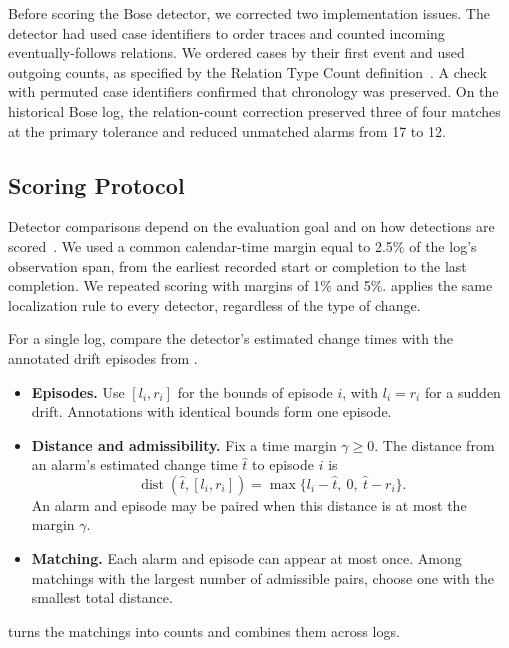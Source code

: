 Before scoring the Bose detector, we corrected two implementation issues. The detector had used case identifiers to order traces and counted incoming eventually-follows relations. We ordered cases by their first event and used outgoing counts, as specified by the Relation Type Count definition~\cite{bose2011handling}. A check with permuted case identifiers confirmed that chronology was preserved. On the historical Bose log, the relation-count correction preserved three of four matches at the primary tolerance and reduced unmatched alarms from 17 to 12.

\subsection{Scoring Protocol}
\label{sec:assessment-scoring}

Detector comparisons depend on the evaluation goal and on how detections are scored~\cite{adams2023experimental}. We used a common calendar-time margin equal to 2.5\% of the log's observation span, from the earliest recorded start or completion to the last completion. We repeated scoring with margins of 1\% and 5\%.  applies the same localization rule to every detector, regardless of the type of change.

\begin{Definition}\label{def:assessment-matching}
For a single log, compare the detector's estimated change times with the annotated drift episodes from .
\begin{itemize}
  \item \textbf{Episodes.} Use $[l_i,r_i]$ for the bounds of episode $i$, with $l_i=r_i$ for a sudden drift. Annotations with identical bounds form one episode.
  \item \textbf{Distance and admissibility.} Fix a time margin $\gamma\geq0$. The distance from an alarm's estimated change time $\hat t$ to episode $i$ is
  \[
     \operatorname{dist}(\hat t,[l_i,r_i])=\max\{l_i-\hat t,\ 0,\ \hat t-r_i\}.
  \]
  An alarm and episode may be paired when this distance is at most the margin $\gamma$.
  \item \textbf{Matching.} Each alarm and episode can appear at most once. Among matchings with the largest number of admissible pairs, choose one with the smallest total distance.
\end{itemize}
\end{Definition}

 turns the matchings into counts and combines them across logs.

